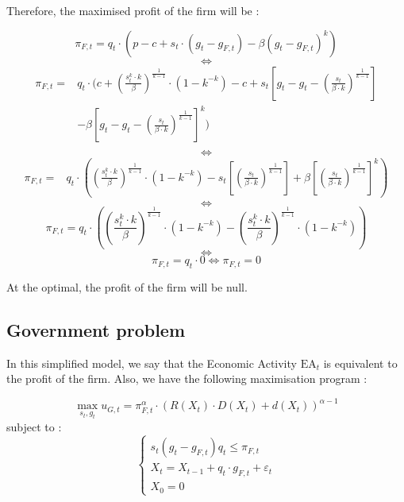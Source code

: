 \documentclass{article}
\begin{document}
Therefore, the maximised profit of the firm will be : 

$$\pi_{F,t}=q_{t}\cdot\left(p-c+s_{t}\cdot\left(g_{t}-g_{F,t}\right)-\beta\left(g_{t}-g_{F,t}\right)^{k}\right)$$
$$\iff$$
\begin{equation*}
    \begin{split}
        \pi_{F,t} = & q_{t}\cdot(c+\left(\frac{s_{t}^k\cdot k}{\beta}\right)^{\frac{1}{k-1}}\cdot\left(1-{k}^{-k}\right)-c+s_{t}\left[g_{t}-g_{t}-\left(\frac{s_{t}}{\beta\cdot k}\right)^{\frac{1}{k-1}}\right] \\
        & -\beta\left[g_{t}-g_{t}-\left(\frac{s_{t}}{\beta\cdot k}\right)^{\frac{1}{k-1}}\right]^{k}) \\
    \end{split}
\end{equation*}
$$\iff$$
\begin{equation*}
    \begin{split}
        \pi_{F,t} = & q_{t}\cdot\left(\left(\frac{s_{t}^k\cdot k}{\beta}\right)^{\frac{1}{k-1}}\cdot\left(1-{k}^{-k}\right)-s_{t}\left[\left(\frac{s_{t}}{\beta\cdot k}\right)^{\frac{1}{k-1}}\right]
        +\beta\left[\left(\frac{s_{t}}{\beta\cdot k}\right)^{\frac{1}{k-1}}\right]^{k}\right)
    \end{split}
\end{equation*}
$$\iff$$
$$ \pi_{F,t} = q_{t}\cdot\left(\left(\frac{s_{t}^k\cdot k}{\beta}\right)^{\frac{1}{k-1}}\cdot\left(1-{k}^{-k}\right)-\left(\frac{s_{t}^k\cdot k}{\beta}\right)^{\frac{1}{k-1}}\cdot\left(1-{k}^{-k}\right)\right) $$
$$\iff$$
\begin{equation}
    \pi_{F,t} = q_{t}\cdot0\iff\pi_{F,t}=0    
\end{equation}

At the optimal, the profit of the firm will be null. 

\subsection{Government problem}

In this simplified model, we say that the Economic Activity $\text{EA}_{t}$ is equivalent to the profit of the firm. Also, we have the following maximisation program : 

$$\max_{s_{t},g_{t}}{u_{G,t}=\pi_{F,t}^\alpha\cdot\left(R(X_{t})\cdot D(X_{t})+d(X_{t})\right)^{\alpha-1}}$$
subject to : 
\begin{equation*}
    \begin{cases}
        s_{t}\left(g_{t}-g_{F,t}\right) q_{t} \le \pi_{F,t} \\
        X_t=X_{t-1}+q_{t}\cdot g_{F,t}+\varepsilon_{t} \\
        X_0=0
    \end{cases}
\end{equation*}
\end{document}
